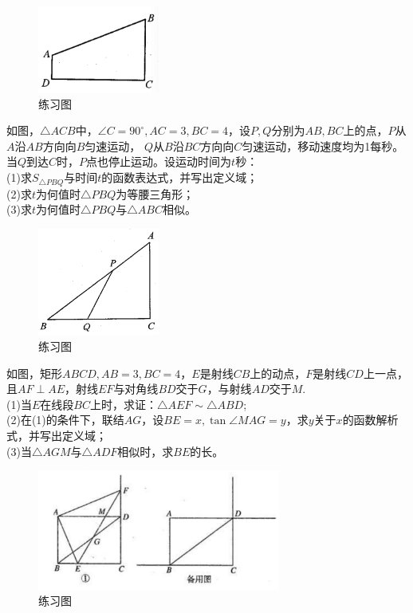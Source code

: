 \documentclass{ecnuthesis}
\begin{document}
\begin{figure}[H]
\centering
\includegraphics[width=4cm]{picture/840.png}
\caption{练习图}
\end{figure}
\begin{problem}
    如图，$\triangle ACB$中，$\angle C=90^\circ,AC=3,BC=4$，设$P,Q$分别为$AB,BC$上的点，$P$从$A$沿$AB$方向向$B$匀速运动，
    $Q$从$B$沿$BC$方向向$C$匀速运动，移动速度均为1每秒。当$Q$到达$C$时，$P$点也停止运动。设运动时间为$t$秒：\\
    (1)求$S_{\triangle PBQ}$与时间$t$的函数表达式，并写出定义域；\\
    (2)求$t$为何值时$\triangle PBQ$为等腰三角形；\\
    (3)求$t$为何值时$\triangle PBQ$与$\triangle ABC$相似。
\end{problem}
\begin{figure}[H]
\centering
\includegraphics[width=4cm]{picture/826.png}
\caption{练习图}
\end{figure}
\begin{problem}
    如图，矩形$ABCD,AB=3,BC=4$，$E$是射线$CB$上的动点，$F$是射线$CD$上一点，且$AF\perp AE$，射线$EF$与对角线$BD$交于$G$，与射线$AD$交于$M$. \\
    (1)当$E$在线段$BC$上时，求证：$\triangle AEF \sim \triangle ABD$; \\
    (2)在(1)的条件下，联结$AG$，设$BE=x,\tan \angle MAG=y$，求$y$关于$x$的函数解析式，并写出定义域；\\
    (3)当$\triangle AGM $与$\triangle ADF $相似时，求$BE$的长。
\end{problem}
\begin{figure}[H]
\centering
\includegraphics[width=8cm]{picture/846.png}
\caption{练习图}
\end{figure}
\clearpage
\end{document}
